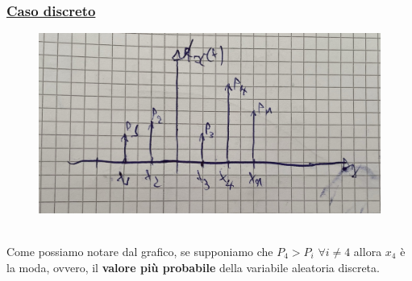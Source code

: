 \documentclass{article}
\begin{document}
\subsubsection{\underline{Caso discreto}}
\begin{figure}[ht]
\centering
\includegraphics[scale=0.10]{images/50.ModaDiscreta.jpeg}
\end{figure} ~\\
Come possiamo notare dal grafico, se supponiamo che $P_4 > P_i$   $\forall i \neq 4$ allora $x_4$ è la moda, ovvero, il \textbf{valore più probabile} della variabile aleatoria discreta.
\end{document}
